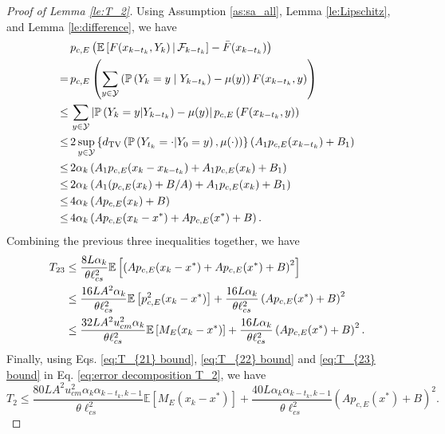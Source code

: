 \documentclass[11 pt]{article}
\begin{document}
\begin{proof}[Proof of Lemma \ref{le:T_2}]
		Using Assumption \ref{as:sa_all}, Lemma \ref{le:Lipschitz}, and Lemma \ref{le:difference}, we have
		\begin{align*}
			& p_{c,E}\left(\mathbb{E}\left[F(x_{k-t_k},Y_k)\,\middle|\,\mathcal{F}_{k-t_k} \right]-\Bar{F}(x_{k-t_k})\right)\\
			=\, & p_{c,E}\left(\sum_{y \in \mathcal{Y}} \left(\mathbb{P}\left(Y_k=y \mid  Y_{k-t_k}\right) - \mu(y)\right)F(x_{k-t_k},y)\right)\\
			\leq \,& \sum_{y \in \mathcal{Y}} \left |\mathbb{P}\left(Y_k=y | Y_{k-t_k}\right) - \mu(y)\right | p_{c,E}\left(F(x_{k-t_k},y)\right)\\
			\leq \,& 2\sup_{y\in\mathcal{Y}}\left\{d_{\text{TV}}\left(\mathbb{P}\left(Y_{t_k}=\cdot | Y_0=y\right), \mu(\cdot)\right)\right\} \left(A_1p_{c,E}(x_{k-t_k})+B_1\right)\\
			\leq \,& 2 \alpha_k \left(A_1p_{c,E}(x_k - x_{k-t_k}) + A_1p_{c,E}(x_k) +B_1\right)\\
			\leq \,& 2 \alpha_k \left(A_1(p_{c,E}(x_k)+B/A) + A_1p_{c,E}(x_k) +B_1\right)\\
			\leq \,& 4 \alpha_k \left(Ap_{c,E}(x_{k})+ B\right)\\
			\leq \,& 4 \alpha_k \left(Ap_{c,E}(x_{k}-x^*) + Ap_{c,E}(x^*) + B\right).
		\end{align*}
		Combining the previous three inequalities together, we have
		\begin{align}
			T_{23} 
			&\leq \frac{8L\alpha_{k}}{\theta \ell^2_{cs}}\mathbb{E}\left[\left(Ap_{c,E}(x_{k} - x^*)+Ap_{c,E}(x^*)+B\right)^2\right]\nonumber\\  
			&\leq \frac{16LA^2\alpha_{k}}{\theta \ell^2_{cs}}\mathbb{E}\left[p^2_{c,E}(x_{k} - x^*)\right] + \frac{16L\alpha_{k}}{\theta \ell^2_{cs}}\left(Ap_{c,E}(x^*)+B\right)^2\nonumber\\
			&\leq \frac{32LA^2u^2_{cm}\alpha_{k}}{\theta \ell^2_{cs}}\mathbb{E}\left[M_{E}(x_{k} - x^*)\right] + \frac{16L\alpha_{k}}{\theta \ell^2_{cs}}\left(Ap_{c,E}(x^*)+B\right)^2.\label{eq:T_{23} bound}
		\end{align}
		Finally, using Eqs. \eqref{eq:T_{21} bound}, \eqref{eq:T_{22} bound} and \eqref{eq:T_{23} bound} in Eq. \eqref{eq:error decomposition T_2}, we have
		$$T_2\leq \frac{80LA^2u_{cm}^2\alpha_k\alpha_{k-t_k,k-1}}{\theta\ell_{cs}^2}\mathbb{E}\left[M_E(x_k-x^*)\right]+\frac{40L\alpha_k\alpha_{k-t_k,k-1}}{\theta\ell_{cs}^2}\left(Ap_{c,E}(x^*)+B\right)^2.$$
	\end{proof}
	
\end{document}
